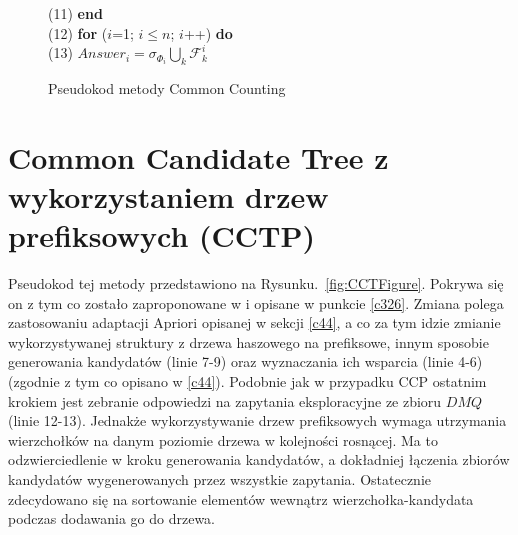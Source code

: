 \begin{figure}[h]
	\hspace*{6em} (11)\hspace{1em} \textbf{end} \\
	\hspace*{6em} (12)\hspace{1em} \textbf{for} ($i$=1; $i \leq n$; $i$++) \textbf{do} \\
	\hspace*{6em} (13)\hspace{2em}    $Answer_i = \sigma_{\Phi_i} \bigcup_k \mathcal{F}_k^i$
	\caption{Pseudokod metody Common Counting}
	\label{fig:CCFigure}
\end{figure}


\section{Common Candidate Tree z wykorzystaniem drzew prefiksowych (CCTP)}
\label{c46}
Pseudokod tej metody przedstawiono na Rysunku.~\ref{fig:CCTFigure}. Pokrywa się on z tym co zostało zaproponowane w \cite{WojciechowskiCCT} i opisane w punkcie \ref{c326}. Zmiana polega zastosowaniu adaptacji Apriori opisanej w sekcji \ref{c44}, a co za tym idzie zmianie wykorzystywanej struktury z drzewa haszowego na prefiksowe, innym sposobie generowania kandydatów (linie 7-9) oraz wyznaczania ich wsparcia (linie 4-6) (zgodnie z tym co opisano w \ref{c44}). Podobnie jak w przypadku CCP ostatnim krokiem jest zebranie odpowiedzi na zapytania eksploracyjne ze zbioru \(DMQ\) (linie 12-13). Jednakże wykorzystywanie drzew prefiksowych wymaga utrzymania wierzchołków na danym poziomie drzewa w kolejności rosnącej. Ma to odzwierciedlenie w kroku generowania kandydatów, a dokładniej łączenia zbiorów kandydatów wygenerowanych przez wszystkie zapytania. Ostatecznie zdecydowano się na sortowanie elementów wewnątrz wierzchołka-kandydata podczas dodawania go do drzewa. 

